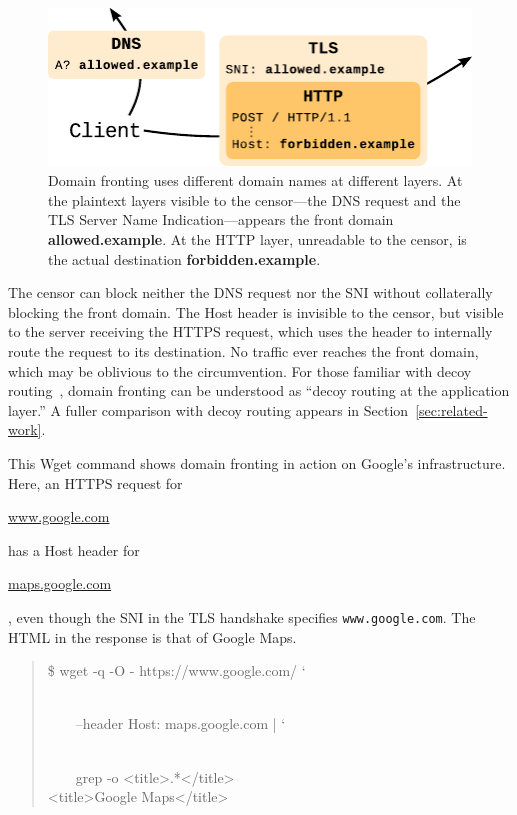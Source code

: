 \documentclass{sig-alternate}
\def\urll#1{\begin{NoHyper}\url{#1}\end{NoHyper}}
\begin{document}
\begin{figure}[ht]
\centering
\includegraphics[width=\linewidth]{fronting-diagram}
\caption{
Domain fronting uses different domain names at different layers.
At the plaintext layers visible to the censor---the DNS request and the
TLS Server Name Indication---appears
the front domain \mbox{\textbf{allowed.example}}.
At the HTTP layer, unreadable to the censor,
is the actual destination \mbox{\textbf{forbidden.example}}.
}
\label{fig:fronting}
\end{figure}

The censor can block neither the DNS request nor the SNI without
collaterally blocking the front domain.
The Host header is invisible to the censor,
but visible to the server receiving the HTTPS request,
which uses the header to internally route the request to its destination.
No traffic ever reaches the front domain,
which may be oblivious to the circumvention.
For those familiar with decoy routing~\cite{decoyrouting,telex,cirripede,tapdance},
domain fronting can be understood as
``decoy routing at the application layer.''
A fuller comparison with decoy routing appears in Section~\ref{sec:related-work}.

This Wget command shows domain fronting in action
on Google's infrastructure.
Here, an HTTPS request for \urll{www.google.com} has a Host header for
\urll{maps.google.com}, even though the SNI in the TLS handshake specifies
\texttt{www.google.com}.
The HTML in the response is that of Google Maps.

\noindent
\begin{quote}
%
\$ wget -q -O - https://www.google.com/ \char`\\\\
\strut~~~~--header \textquotesingle{}Host: maps.google.com\textquotesingle{} | \char`\\\\
\strut~~~~grep -o \textquotesingle{}<title>.*</title>\textquotesingle{}\\
<title>Google Maps</title>
\end{quote}
\end{document}
